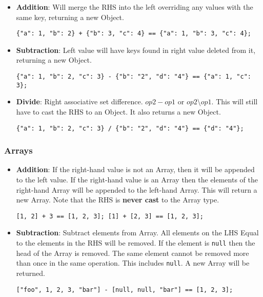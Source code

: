 \begin{itemize}
    \item \textbf{Addition}: Will merge the RHS into the left overriding any values with the same key, returning a new Object.
    \begin{verbatim}
{"a": 1, "b": 2} + {"b": 3, "c": 4} == {"a": 1, "b": 3, "c": 4};
    \end{verbatim}
    \item \textbf{Subtraction}: Left value will have keys found in right value deleted from it, returning a new Object.
    \begin{verbatim}
{"a": 1, "b": 2, "c": 3} - {"b": "2", "d": "4"} == {"a": 1, "c": 3};
    \end{verbatim}
    \item \textbf{Divide}: Right associative set difference. $op2 - op1$ or $op2 \setminus op1$. This will still have to cast the RHS to an Object. It also returns a new Object.
    \begin{verbatim}
{"a": 1, "b": 2, "c": 3} / {"b": "2", "d": "4"} == {"d": "4"};
    \end{verbatim}
\end{itemize}

\subsubsection{Arrays}

\begin{itemize}
    \item \textbf{Addition}: If the right-hand value is not an Array, then it will be appended to the left value. If the right-hand value is an Array then the elements of the right-hand Array will be appended to the left-hand Array. This will return a new Array. Note that the RHS is \textbf{never cast} to the Array type.
    \begin{verbatim}
[1, 2] + 3 == [1, 2, 3]; [1] + [2, 3] == [1, 2, 3];
    \end{verbatim}
    \item \textbf{Subtraction}: Subtract elements from Array. All elements on the LHS Equal to the elements in the RHS will be removed. If the element is \verb|null| then the head of the Array is removed. The same element cannot be removed more than once in the same operation. This includes \verb|null|. A new Array will be returned.
    \begin{verbatim}
["foo", 1, 2, 3, "bar"] - [null, null, "bar"] == [1, 2, 3];
    \end{verbatim}
\end{itemize}

